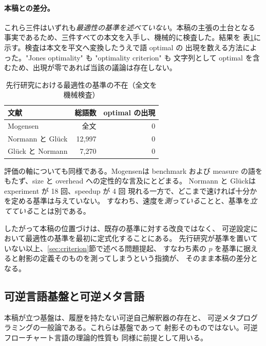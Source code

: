 \paragraph{本稿との差分。}
これら三件はいずれも\emph{最適性の基準を述べていない}。本稿の主張の土台となる
事実であるため、三件すべての本文を入手し、機械的に検査した。結果を
表\ref{tab:novelty}に示す。検査は本文を平文へ変換したうえで語 optimal の
出現を数える方法によった。"Jones optimality" も "optimality criterion" も
文字列として optimal を含むため、出現が零であれば当該の議論は存在しない。

\begin{table}[tb]
  \caption{先行研究における最適性の基準の不在（全文を機械検査）}
  \label{tab:novelty}
  \begin{center}
  \begin{tabular}{lrr}
    \hline
    文献 & 総語数 & optimal の出現 \\
    \hline
    Mogensen \cite{Mogensen2011} & 全文 & 0 \\
    Normann と Gl\"{u}ck \cite{Normann2024} & 12{,}997 & 0 \\
    Gl\"{u}ck と Normann \cite{Gluck2024} & 7{,}270 & 0 \\
    \hline
  \end{tabular}
  \end{center}
\end{table}

評価の軸についても同様である。Mogensen\cite{Mogensen2011}は benchmark および
measure の語をもたず、size と overhead への定性的な言及にとどまる。
Normann と Gl\"{u}ck\cite{Normann2024}は experiment が 18 回、speedup が 4 回
現れる一方で、どこまで速ければ十分かを定める基準は与えていない。
すなわち、速度を\emph{測っている}ことと、基準を\emph{立てている}ことは別である。

したがって本稿の位置づけは、既存の基準に対する改良ではなく、
可逆設定において最適性の基準を最初に定式化することにある。
先行研究が基準を置いていない以上、\ref{sec:criterion}節で述べる問題提起、
すなわち素の $p$ を基準に据えると射影の定義そのものを測ってしまうという指摘が、
そのまま本稿の差分となる。

\subsection{可逆言語基盤と可逆メタ言語}
\label{sec:related-foundation}

本稿が立つ基盤は、履歴を持たない可逆自己解釈器の存在\cite{YokoyamaGluck2007}と、
可逆メタプログラミングの一般論\cite{GKY2022,GY2023}である。これらは基盤であって
射影そのものではない。可逆フローチャート言語の理論的性質\cite{YAG2016}も
同様に前提として用いる。

